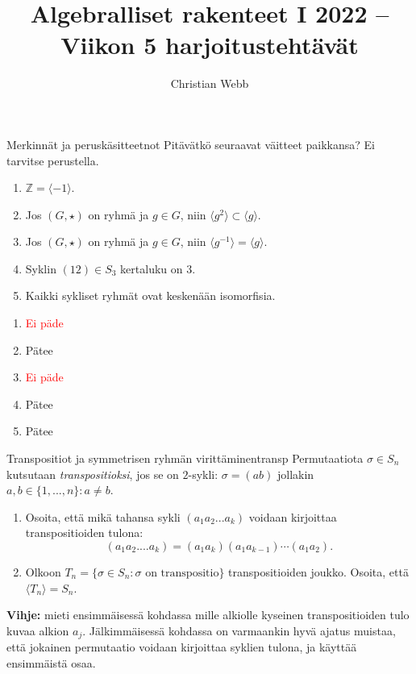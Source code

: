 \documentclass[11pt,a4paper]{amsart}
\title{Algebralliset rakenteet I 2022 -- Viikon 5 harjoitustehtävät}
\author{Christian Webb}
\newcommand{\Z}{\mathbb{Z}}
\newcommand{\1}{\mathbf{1}}
\begin{document}
\maketitle

\medskip

\begin{Exercises}{Merkinnät ja peruskäsitteet}{not}
Pitävätkö seuraavat väitteet paikkansa? Ei tarvitse perustella. 
\begin{enumerate}
\item $\Z=\langle -1\rangle$.
\item Jos $(G,\star)$ on ryhmä ja $g\in G$, niin $\langle g^2\rangle \subset \langle g\rangle$.
\item Jos $(G,\star)$ on ryhmä ja $g\in G$, niin $\langle g^{-1}\rangle =\langle g\rangle$.
\item Syklin $(12)\in S_3$ kertaluku on $3$.
\item Kaikki sykliset ryhmät ovat keskenään isomorfisia.
\end{enumerate}
\end{Exercises}

\begin{Solution}
	\begin{enumerate}
		\item \textcolor{red}{Ei päde}
		\item Pätee
		\item \textcolor{red}{Ei päde}
		\item Pätee
		\item Pätee
	\end{enumerate}
\end{Solution}


\begin{Exercises}{Transpositiot ja symmetrisen ryhmän virittäminen}{transp}
Permutaatiota $\sigma \in S_n$ kutsutaan \emph{transpositioksi}, jos se on $2$-sykli: $\sigma=(ab)$ jollakin $a,b\in \{1,...,n\}: a\neq b$.
\begin{enumerate}
\item Osoita, että mikä tahansa sykli $(a_1a_2...a_k)$ voidaan kirjoittaa transpositioiden tulona:
\[
(a_1a_2....a_k)=(a_1a_k)(a_1a_{k-1})\cdots (a_1a_2).
\]
\item Olkoon $T_n=\{\sigma\in S_n: \sigma \text{ on transpositio}\}$ transpositioiden joukko. Osoita, että $\langle T_n\rangle=S_n$.
\end{enumerate}
{\bf Vihje:} mieti ensimmäisessä kohdassa mille alkiolle kyseinen transpositioiden tulo kuvaa alkion $a_j$. Jälkimmäisessä kohdassa on varmaankin hyvä ajatus muistaa, että jokainen permutaatio voidaan kirjoittaa syklien tulona, ja käyttää ensimmäistä osaa.
\end{Exercises}
\end{document}
